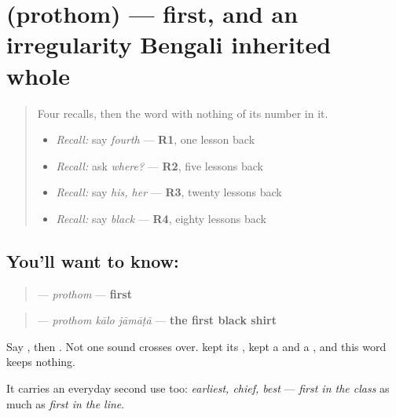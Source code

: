 \section[\texorpdfstring{\bn{প্রথম} (prothom)}{প্রথম (prothom)}]{ (prothom) — first, and an irregularity Bengali inherited whole}

\label{lesson:BN-C27-prothom}



\begin{quote}
Four recalls, then the word with nothing of its number in it.

\begin{itemize}
\raggedright
  \item \emph{Recall:} say \emph{fourth} — \textbf{R1}, one lesson back
  \item \emph{Recall:} ask \emph{where?} — \textbf{R2}, five lessons back
  \item \emph{Recall:} say \emph{his, her} — \textbf{R3}, twenty lessons back
  \item \emph{Recall:} say \emph{black} — \textbf{R4}, eighty lessons back
\end{itemize}
\end{quote}

\subsection*{You'll want to know: }
\begin{quote}
\textbf{} — \emph{prothom} — \textbf{first}
\end{quote}

\begin{quote}
\textbf{  } — \emph{prothom kālo jāmāṭā} — \textbf{the first black shirt}
\end{quote}

Say \textbf{}, then \textbf{}. Not one sound crosses over. \textbf{} kept its \textbf{}, \textbf{} kept a \textbf{} and a \textbf{}, and this word keeps nothing.

It carries an everyday second use too: \emph{earliest, chief, best} — \emph{first in the class} as much as \emph{first in the line}.

